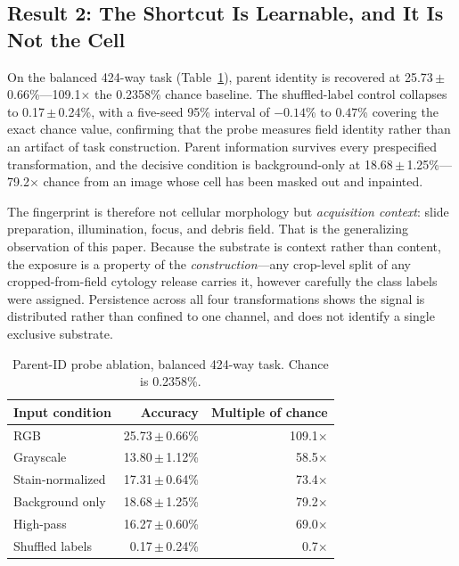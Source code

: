 \documentclass[conference]{IEEEtran}
\newcommand{\meanpm}[2]{#1\,$\pm$\,#2}
\begin{document}
\subsection{Result 2: The Shortcut Is Learnable, and It Is Not the Cell}
On the balanced 424-way task (Table~\ref{tab:probe}), parent identity is recovered at \meanpm{25.73}{0.66}\%---109.1$\times$ the 0.2358\% chance baseline.
The shuffled-label control collapses to \meanpm{0.17}{0.24}\%, with a five-seed 95\% interval of $-0.14$\% to $0.47$\% covering the exact chance value, confirming that the probe measures field identity rather than an artifact of task construction.
Parent information survives every prespecified transformation, and the decisive condition is background-only at \meanpm{18.68}{1.25}\%---79.2$\times$ chance from an image whose cell has been masked out and inpainted.

The fingerprint is therefore not cellular morphology but \emph{acquisition context}: slide preparation, illumination, focus, and debris field.
That is the generalizing observation of this paper.
Because the substrate is context rather than content, the exposure is a property of the \emph{construction}---any crop-level split of any cropped-from-field cytology release carries it, however carefully the class labels were assigned.
Persistence across all four transformations shows the signal is distributed rather than confined to one channel, and does not identify a single exclusive substrate.

\begin{table}[t]
\caption{Parent-ID probe ablation, balanced 424-way task. Chance is 0.2358\%.}
\label{tab:probe}
\centering
\scriptsize
\setlength{\tabcolsep}{4.2pt}
\begin{tabular}{lrr}
\toprule
Input condition & Accuracy & Multiple of chance \\
\midrule
RGB & \meanpm{25.73}{0.66}\% & 109.1$\times$ \\
Grayscale & \meanpm{13.80}{1.12}\% & 58.5$\times$ \\
Stain-normalized & \meanpm{17.31}{0.64}\% & 73.4$\times$ \\
Background only & \meanpm{18.68}{1.25}\% & 79.2$\times$ \\
High-pass & \meanpm{16.27}{0.60}\% & 69.0$\times$ \\
Shuffled labels & \meanpm{0.17}{0.24}\% & 0.7$\times$ \\
\bottomrule
\end{tabular}
\end{table}
\end{document}
